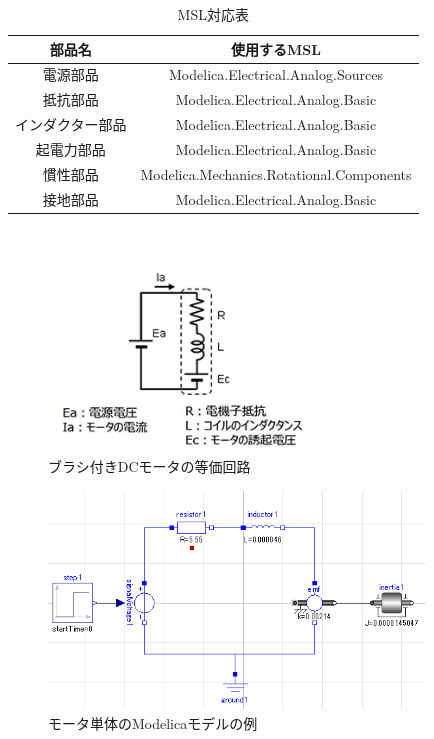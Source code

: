 \begin{table}[t]
	\centering
	\caption{MSL対応表}
	\begin{tabular}{|c|c|} \hline
	  部品名 & 使用するMSL \\ \hline \hline
	  電源部品 & Modelica.Electrical.Analog.Sources \\ \hline
	  抵抗部品 & Modelica.Electrical.Analog.Basic \\ \hline
	  インダクター部品 & Modelica.Electrical.Analog.Basic \\ \hline
	  起電力部品 & Modelica.Electrical.Analog.Basic \\ \hline
	  慣性部品 & Modelica.Mechanics.Rotational.Components \\ \hline
	  接地部品 & Modelica.Electrical.Analog.Basic \\ \hline
	\end{tabular}
	\label{tab:MSL}
  \end{table}
　
\begin{figure}[t]
	\centering
	\includegraphics[width=7cm]{./Image/touka.png}
	\caption{ブラシ付きDCモータの等価回路}
	\label{fig:touka}
  \end{figure}

\begin{figure}[t]
  \centering
  \includegraphics[width=10cm]{./Image/tantai_model.png}
  \caption{モータ単体のModelicaモデルの例}
  \label{fig:tantai_model}
\end{figure}


